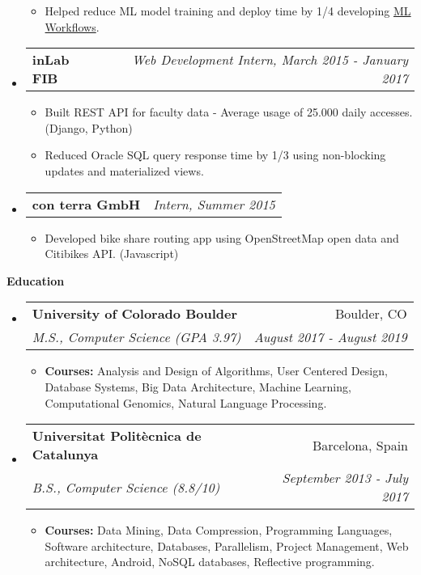 \documentclass[letterpaper,10pt]{article}
\makeatletter
\newcommand{\resitem}[1]{\item #1 \vspace{-2pt}}
\newcommand{\resheading}[1]{{\large \colorbox{mygrey}{\begin{minipage}{\textwidth}{\textbf{#1 \vphantom{p\^{E}}}}\end{minipage}}}}
\newcommand{\ressubheading}[4]{
\begin{tabular*}{7.0in}{l@{\extracolsep{\fill}}r}
		\textbf{#1} & \textit{#4} \\
\end{tabular*}\vspace{-6pt}}
\newcommand{\ressubheadinged}[4]{
\begin{tabular*}{7.0in}{l@{\extracolsep{\fill}}r}
		\textbf{#1} & #2 \\
		\textit{#3} & \textit{#4}\\
\end{tabular*}\vspace{-6pt}}
\makeatother
\begin{document}
\begin{itemize}
\begin{itemize}
				\resitem{Helped reduce ML model training and deploy time by 1/4 developing \href{https://blog.twitter.com/engineering/en_us/topics/insights/2018/ml-workflows.html}{ML Workflows}.}
			\end{itemize}
		\item
			\ressubheading{inLab FIB}{Barcelona, Spain}{Web Development Intern}{Web Development Intern, March 2015 - January 2017}
			\begin{itemize}
				\resitem{Built REST API for faculty data - Average usage of 25.000 daily accesses. (Django, Python)}
				\resitem{Reduced Oracle SQL query response time by 1/3 using non-blocking updates and materialized views.}
			\end{itemize}

		\item
			\ressubheading{con terra GmbH}{Münster, Germany}{Intern}{Intern, Summer 2015}
			\begin{itemize}
				\resitem{Developed bike share routing app using OpenStreetMap open data and Citibikes API. (Javascript)}
			\end{itemize}
	\end{itemize}
\break
\resheading{Education}
	\begin{itemize}
		\item
			\ressubheadinged{University of Colorado Boulder}{Boulder, CO}{M.S., Computer Science (GPA 3.97)}{August 2017 - August 2019}
			\begin{itemize}
				\resitem{\textbf{Courses:} Analysis and Design of Algorithms, User Centered Design, Database Systems, Big Data Architecture, Machine Learning, Computational Genomics, Natural Language Processing.}
			\end{itemize}

		\item
			\ressubheadinged{Universitat Polit\`ecnica de Catalunya}{Barcelona, Spain}{B.S., Computer Science (8.8/10)}{September 2013 - July 2017}
			\begin{itemize}
				\resitem{\textbf{Courses:} Data Mining, Data Compression, Programming Languages, Software architecture, Databases, Parallelism, Project Management, Web architecture, Android, NoSQL databases, Reflective programming.}
			\end{itemize}

	\end{itemize}
\end{document}

